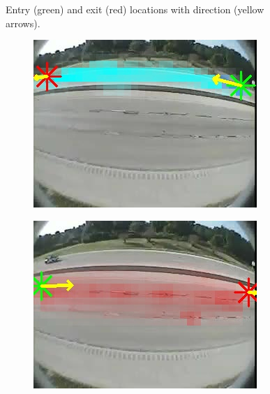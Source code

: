 \begin{figure}
\begin{subfigure}{0.32\linewidth}
        \end{subfigure}
        \caption{Entry (green) and exit (red) locations with direction (yellow arrows).}
        \label{fig:entry-exit-app-3}
\end{figure}
\begin{figure}
    \centering
        \begin{subfigure}{0.32\linewidth}
            \includegraphics[width=\linewidth]{./img/scene_learning/res/252707/252707-0.jpg}
        \end{subfigure}
        \begin{subfigure}{0.32\linewidth}
            \includegraphics[width=\linewidth]{./img/scene_learning/res/252707/252707-1.jpg}
        \end{subfigure}

\end{figure}
